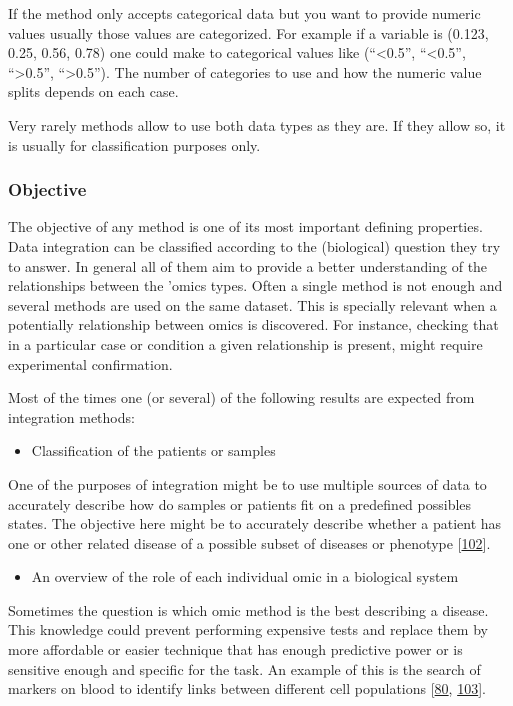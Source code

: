 \documentclass[
  12pt,
  a4paper,
  twoside,
  openright]{book}
\providecommand{\tightlist}{%
  \setlength{\itemsep}{0pt}\setlength{\parskip}{0pt}}
\begin{document}
If the method only accepts categorical data but you want to provide numeric values usually those values are categorized.
For example if a variable is (0.123, 0.25, 0.56, 0.78) one could make to categorical values like (``\textless0.5'', ``\textless0.5'', ``\textgreater0.5'', ``\textgreater0.5'').
The number of categories to use and how the numeric value splits depends on each case.

Very rarely methods allow to use both data types as they are.
If they allow so, it is usually for classification purposes only.

\hypertarget{objective}{%
\subsubsection{Objective}\label{objective}}

The objective of any method is one of its most important defining properties.
Data integration can be classified according to the (biological) question they try to answer.
In general all of them aim to provide a better understanding of the relationships between the 'omics types.
Often a single method is not enough and several methods are used on the same dataset.
This is specially relevant when a potentially relationship between omics is discovered.
For instance, checking that in a particular case or condition a given relationship is present, might require experimental confirmation.

Most of the times one (or several) of the following results are expected from integration methods:

\begin{itemize}
\tightlist
\item
  Classification of the patients or samples
\end{itemize}

One of the purposes of integration might be to use multiple sources of data to accurately describe how do samples or patients fit on a predefined possibles states.
The objective here might be to accurately describe whether a patient has one or other related disease of a possible subset of diseases or phenotype {[}\protect\hyperlink{ref-rohart2016}{102}{]}.

\begin{itemize}
\tightlist
\item
  An overview of the role of each individual omic in a biological system
\end{itemize}

Sometimes the question is which omic method is the best describing a disease.
This knowledge could prevent performing expensive tests and replace them by more affordable or easier technique that has enough predictive power or is sensitive enough and specific for the task.
An example of this is the search of markers on blood to identify links between different cell populations {[}\protect\hyperlink{ref-tang2017}{80}, \protect\hyperlink{ref-ibrahim2017}{103}{]}.
\end{document}
